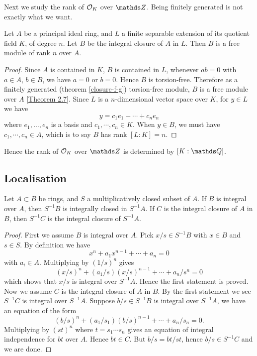 			Next we study the rank of $\mathcal{O}_K$ over $\Z$. Being finitely generated is not exactly what we want.
			
			\begin{theorem}
				Let $A$ be a principal ideal ring, and $L$ a finite separable extension of its quotient field $K$, of degree $n$. Let $B$ be the integral closure of $A$ in $L$. Then $B$ is a free module of rank $n$ over $A$. 
			\end{theorem}
		
			\begin{proof}
				Since $A$ is contained in $K$, $B$ is contained in $L$, whenever $ab=0$ with $a \in A$, $b \in B$, we have $a=0$ or $b=0$. Hence $B$ is torsion-free. Therefore as a finitely generated (theorem \ref{closure-f-g}) torsion-free module, $B$ is a free module over $A$ \href{http://du.ac.in/du/uploads/departments/mathematics/study-material/MMATH18-201\%20_MT_PID.pdf}{[Theorem 2.7]}. Since $L$ is a $n$-dimensional vector space over $K$, for $y \in L$ we have
				\[
					y = c_1e_1+\cdots+c_ne_n
				\]
				where $e_1,\dots,e_n$ is a basis and $c_1,\cdots,c_n \in K$. When $y \in B$, we must have $c_1,\cdots,c_n \in A$, which is to say $B$ has rank $[L:K]=n$.
			\end{proof}
			Hence the rank of $\mathcal{O}_K$ over $\Z$ is determined by $[K:\Q]$.
		
		\subsection{Localisation}
		
			\begin{theorem}
				Let $A \subset B$ be rings, and $S$ a multiplicatively closed subset of $A$. If $B$ is integral over $A$, then $S^{-1}B$ is integrally closed in $S^{-1}A$. If $C$ is the integral closure of $A$ in $B$, then $S^{-1}C$ is the integral closure of $S^{-1}A$. 
			\end{theorem}
		
			\begin{proof}
				First we assume $B$ is integral over $A$. Pick $x/s \in S^{-1}B$ with $x \in B$ and $s \in S$. By definition we have
				\[
					x^n + a_1x^{n-1}+\cdots + a_n = 0
				\]
				with $a_i \in A$. Multiplying by $(1/s)^n$ gives
				\[
					(x/s)^n + (a_1/s)(x/s)^{n-1}+\cdots+a_n/s^n = 0
				\]
				which shows that $x/s$ is integral over $S^{-1}A$. Hence the first statement is proved. \\
				Now we assume $C$ is the integral closure of $A$ in $B$. By the first statement we see $S^{-1}C$ is integral over $S^{-1}A$. Suppose $b/s \in S^{-1}B$ is integral over $S^{-1}A$, we have an equation of the form
				\[
					(b/s)^n+(a_1/s_1)(b/s)^{n-1}+\cdots+a_n/s_n=0.
				\]
				Multiplying by $(st)^n$ where $t=s_1\cdots s_n$ gives an equation of integral independence for $bt$ over $A$. Hence $bt \in C$. But $b/s = bt/st$, hence $b/s \in S^{-1}C$ and we are done. 
			\end{proof}
		
